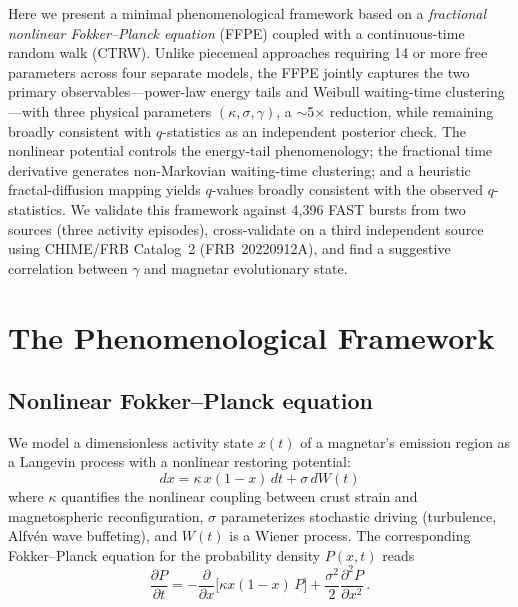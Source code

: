 \documentclass[twocolumn]{article}
\begin{document}
Here we present a minimal phenomenological framework based on a \emph{fractional nonlinear Fokker--Planck equation} (FFPE) coupled with a continuous-time random walk (CTRW). Unlike piecemeal approaches requiring 14 or more free parameters across four separate models, the FFPE jointly captures the two primary observables---power-law energy tails and Weibull waiting-time clustering---with three physical parameters $(\kappa, \sigma, \gamma)$, a $\sim$5$\times$ reduction, while remaining broadly consistent with $q$-statistics as an independent posterior check. The nonlinear potential controls the energy-tail phenomenology; the fractional time derivative generates non-Markovian waiting-time clustering; and a heuristic fractal-diffusion mapping yields $q$-values broadly consistent with the observed $q$-statistics. We validate this framework against 4{,}396 FAST bursts from two sources (three activity episodes), cross-validate on a third independent source using CHIME/FRB Catalog~2 (FRB~20220912A), and find a suggestive correlation between $\gamma$ and magnetar evolutionary state.


\section{The Phenomenological Framework}

\subsection{Nonlinear Fokker--Planck equation}

We model a dimensionless activity state $x(t)$ of a magnetar's emission region as a Langevin process with a nonlinear restoring potential:
\begin{equation}
dx = \kappa\, x(1 - x)\,dt + \sigma\,dW(t)
\label{eq:langevin}
\end{equation}
where $\kappa$ quantifies the nonlinear coupling between crust strain and magnetospheric reconfiguration, $\sigma$ parameterizes stochastic driving (turbulence, Alfv\'en wave buffeting), and $W(t)$ is a Wiener process. The corresponding Fokker--Planck equation for the probability density $P(x,t)$ reads
\begin{equation}
\frac{\partial P}{\partial t} = -\frac{\partial}{\partial x}\bigl[\kappa x(1-x)\,P\bigr] + \frac{\sigma^2}{2}\frac{\partial^2 P}{\partial x^2}\,.
\label{eq:FP}
\end{equation}
\end{document}
